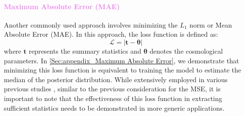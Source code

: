\documentclass{aa}
\begin{document}
\paragraph{\textcolor{violet}{Maximum Absolute Error (MAE)}}
Another commonly used approach involves minimizing the $L_1$ norm or Mean Absolute Error (MAE). In this approach, the loss function is defined as:
\begin{equation}
    \mathcal{L}=|\bm{t}-\bm{\theta}|
\end{equation}
where $\bm{t}$ represents the summary statistics and $\bm{\theta}$ denotes the cosmological parameters.
In \autoref{Sec:appendix_Maximum Absolute Error}, we demonstrate that minimizing this loss function is equivalent to training the model to estimate the median of the posterior distribution. While extensively employed in various previous studies \citep{2018PhRvD..97j3515G, fluri2018cosmological, ribli2019weak}, similar to the previous consideration for the MSE, it is important to note that the effectiveness of this loss function in extracting sufficient statistics needs to be demonstrated in more generic applications.
\end{document}
